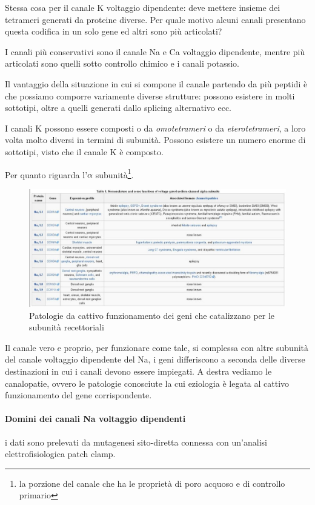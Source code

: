 \documentclass[a4paper,12pt]{article}
\begin{document}
Stessa cosa per il canale K voltaggio dipendente: deve mettere insieme dei tetrameri generati da proteine diverse. Per quale motivo alcuni canali presentano questa codifica in un solo gene ed altri sono più articolati?

I canali più conservativi sono il canale Na e Ca voltaggio dipendente, mentre più articolati sono quelli sotto controllo chimico e i canali potassio.

Il vantaggio della situazione in cui si compone il canale partendo da più peptidi è che possiamo comporre variamente diverse strutture: possono esistere in molti sottotipi, oltre a quelli generati dallo splicing alternativo ecc.

I canali K possono essere composti o da \emph{omotetrameri} o da \emph{eterotetrameri}, a loro volta molto diversi in termini di subunità. Possono esistere un numero enorme di sottotipi, visto che il canale K è composto.

Per quanto riguarda l'$\alpha$ subunità\footnote{la porzione del canale che ha le proprietà di poro acquoso e di controllo primario}. 
 
\begin{figure}[H]
\centering
\includegraphics[scale=0.4]{immagine/canalopatie.jpg}
\caption{Patologie da cattivo funzionamento dei geni che catalizzano per le subunità recettoriali}
\end{figure} 

Il canale vero e proprio, per funzionare come tale, si complessa con altre subunità del canale voltaggio dipendente del Na, i geni differiscono a seconda delle diverse destinazioni in cui i canali devono essere impiegati. A destra vediamo le canalopatie, ovvero le patologie conosciute la cui  eziologia è legata al cattivo funzionamento del gene corrispondente.

\paragraph{Domini dei canali Na voltaggio dipendenti}
i dati sono prelevati da mutagenesi sito-diretta connessa con un'analisi elettrofisiologica patch clamp.
\end{document}
